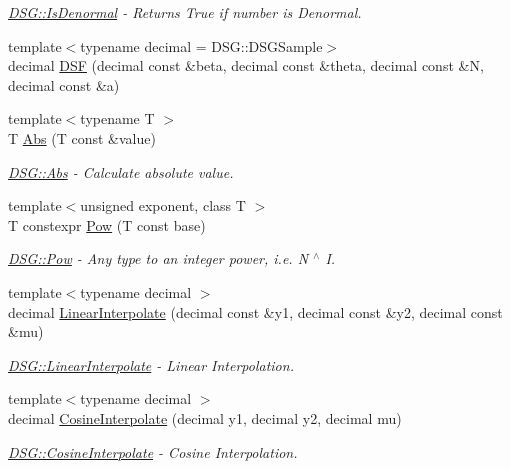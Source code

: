 \begin{DoxyCompactItemize}
\begin{DoxyCompactList}\small\item\em \hyperlink{namespace_d_s_g_a9eee3c39a1f45d42f0b4fa7201d3ba3d}{D\+S\+G\+::\+Is\+Denormal} -\/ Returns True if number is Denormal. \end{DoxyCompactList}\item 
{\footnotesize template$<$typename decimal  = D\+S\+G\+::\+D\+S\+G\+Sample$>$ }\\decimal \hyperlink{namespace_d_s_g_aac6959add6359f512191ddcd17fd6373}{D\+S\+F} (decimal const \&beta, decimal const \&theta, decimal const \&N, decimal const \&a)
\item 
{\footnotesize template$<$typename T $>$ }\\T \hyperlink{namespace_d_s_g_a0af03bade7e25e8da80e3022af0e45a7}{Abs} (T const \&value)
\begin{DoxyCompactList}\small\item\em \hyperlink{namespace_d_s_g_a0af03bade7e25e8da80e3022af0e45a7}{D\+S\+G\+::\+Abs} -\/ Calculate absolute value. \end{DoxyCompactList}\item 
{\footnotesize template$<$unsigned exponent, class T $>$ }\\T constexpr \hyperlink{namespace_d_s_g_a34372a42acb2d6d62d18effc379857bc}{Pow} (T const base)
\begin{DoxyCompactList}\small\item\em \hyperlink{namespace_d_s_g_a34372a42acb2d6d62d18effc379857bc}{D\+S\+G\+::\+Pow} -\/ Any type to an integer power, i.\+e. N $^\wedge$ I. \end{DoxyCompactList}\item 
{\footnotesize template$<$typename decimal $>$ }\\decimal \hyperlink{namespace_d_s_g_af4448472776648fb65623fd29eed262f}{Linear\+Interpolate} (decimal const \&y1, decimal const \&y2, decimal const \&mu)
\begin{DoxyCompactList}\small\item\em \hyperlink{namespace_d_s_g_af4448472776648fb65623fd29eed262f}{D\+S\+G\+::\+Linear\+Interpolate} -\/ Linear Interpolation. \end{DoxyCompactList}\item 
{\footnotesize template$<$typename decimal $>$ }\\decimal \hyperlink{namespace_d_s_g_a293229b6a440ddf9cc87e9a76d322d43}{Cosine\+Interpolate} (decimal y1, decimal y2, decimal mu)
\begin{DoxyCompactList}\small\item\em \hyperlink{namespace_d_s_g_a293229b6a440ddf9cc87e9a76d322d43}{D\+S\+G\+::\+Cosine\+Interpolate} -\/ Cosine Interpolation. \end{DoxyCompactList}\item 

\end{DoxyCompactItemize}
